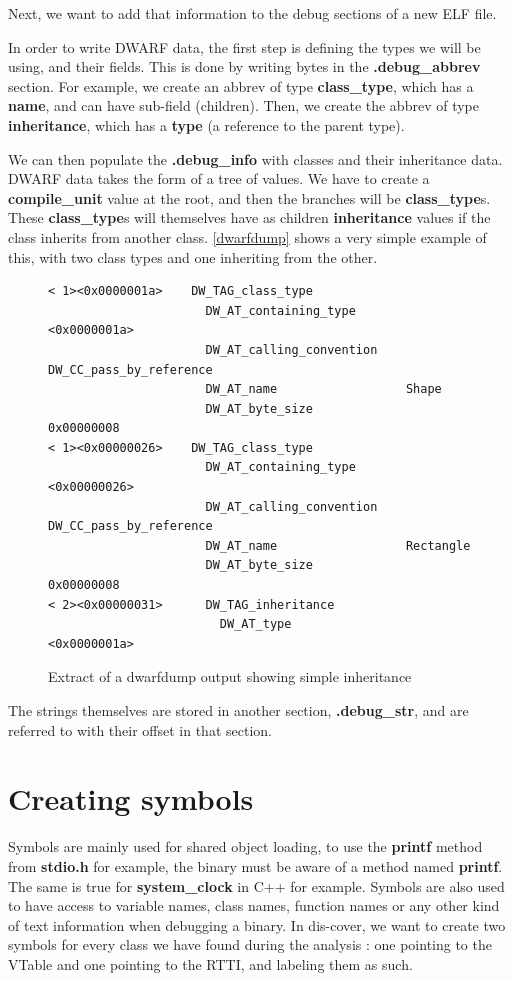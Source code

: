 \documentclass[a4paper,11pt,oneside]{report}
\begin{document}
Next, we want to add that information to the debug sections of a new ELF file.

In order to write DWARF data, the first step is defining the types we will be 
using, and their fields.
This is done by writing bytes in the \textbf{.debug\_abbrev} section.
For example, we create an abbrev of type \textbf{class\_type}, which has a 
\textbf{name}, and can have sub-field (children).
Then, we create the abbrev of type \textbf{inheritance}, which has a 
\textbf{type} (a reference to the parent type).

We can then populate the \textbf{.debug\_info} with classes and their 
inheritance data.
DWARF data takes the form of a tree of values. We have to create a 
\textbf{compile\_unit} value at the root, and then the branches will be 
\textbf{class\_type}s.
These \textbf{class\_type}s will themselves have as children 
\textbf{inheritance} values if the class inherits from another class.
\autoref{dwarfdump} shows a very simple example of this, with two class types 
and one inheriting from the other.

\begin{figure}[h]
\begin{lstlisting}
< 1><0x0000001a>    DW_TAG_class_type
                      DW_AT_containing_type       <0x0000001a>
                      DW_AT_calling_convention    DW_CC_pass_by_reference
                      DW_AT_name                  Shape
                      DW_AT_byte_size             0x00000008
< 1><0x00000026>    DW_TAG_class_type
                      DW_AT_containing_type       <0x00000026>
                      DW_AT_calling_convention    DW_CC_pass_by_reference
                      DW_AT_name                  Rectangle
                      DW_AT_byte_size             0x00000008
< 2><0x00000031>      DW_TAG_inheritance
                        DW_AT_type                  <0x0000001a>
\end{lstlisting}
\caption{Extract of a dwarfdump output showing simple inheritance}
\label{dwarfdump}
\end{figure}

The strings themselves are stored in another section, \textbf{.debug\_str}, and 
are referred to with their offset in that section.

\section{Creating symbols}

Symbols are mainly used for shared object loading, to use the \textbf{printf}
method from \textbf{stdio.h} for example, the binary must be aware of a
method named \textbf{printf}. The same is true for
\textbf{system\_clock} in C++ for example.
Symbols are also used to have access to variable names, class names, function
names or any other kind of text information when debugging a binary.
In dis-cover, we want to create two symbols for every class we have found
during the analysis : one pointing to the VTable and one pointing to the RTTI,
and labeling them as such.
\end{document}
